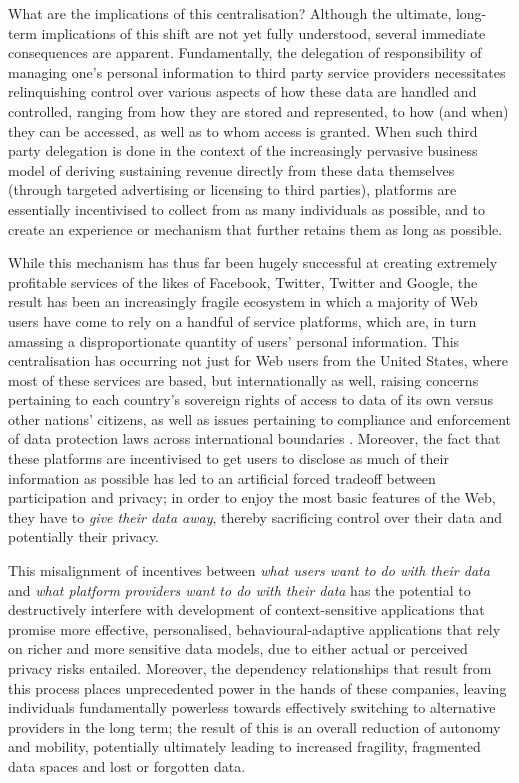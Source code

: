 \documentclass[runningheads,a4paper]{llncs}
\begin{document}
What are the implications of this centralisation?  Although the ultimate, long-term implications of this shift are not yet fully understood, several immediate consequences are apparent. Fundamentally, the delegation of responsibility of managing one's personal information to third party service providers necessitates relinquishing control over various aspects of how these data are handled and controlled, ranging from how they are stored and represented, to how (and when) they can be accessed, as well as to whom access is granted.  When such third party delegation is done in the context of the increasingly pervasive business model of deriving sustaining revenue directly from these data themselves (through targeted advertising or licensing to third parties), platforms are essentially incentivised to collect from as many individuals as possible, and to create an experience or mechanism that further retains them as long as possible.

While this mechanism has thus far been hugely successful at creating extremely profitable services of the likes of Facebook, Twitter, Twitter and Google, the result has been an increasingly fragile ecosystem in which a majority of Web users have come to rely on a handful of service platforms, which are, in turn amassing a disproportionate quantity of users' personal information.  This centralisation has occurring not just for Web users from the United States, where most of these services are based, but internationally as well, raising concerns pertaining to each country's sovereign rights of access to data of its own versus other nations' citizens, as well as issues pertaining to compliance and enforcement of data protection laws across international boundaries \cite{internationalownership}. Moreover, the fact that these platforms are incentivised to get users to disclose as much of their information as possible has led to an artificial forced tradeoff between participation and privacy; in order to enjoy the most basic features of the Web, they have to \emph{give their data away}, thereby sacrificing control over their data and potentially their privacy.

This misalignment of incentives between \emph{what users want to do with their data} and \emph{what platform providers want to do with their data} has the potential to destructively interfere with development of context-sensitive applications that promise more effective, personalised, behavioural-adaptive applications that rely on richer and more sensitive data models, due to either actual or perceived privacy risks entailed.  Moreover, the dependency relationships that result from this process places unprecedented power in the hands of these companies, leaving individuals fundamentally powerless towards effectively switching to alternative providers in the long term; the result of this is an overall reduction of autonomy and mobility, potentially ultimately leading to increased fragility, fragmented data spaces and lost or forgotten data\cite{lostlegacy}.
\end{document}
